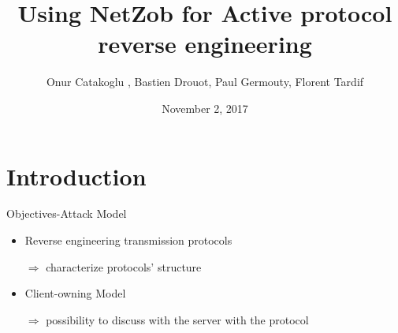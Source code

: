 \documentclass{beamer}
\newcounter{m} %
\newcounter{c} %
\begin{document}




\title{Using NetZob for Active protocol reverse engineering }   
\author{Onur Catakoglu , Bastien Drouot, Paul Germouty, Florent Tardif} 
\date{November 2, 2017} 




\begin{frame}

	\titlepage
\end{frame}





\begin{frame}


	\tableofcontents

\end{frame}

\section{Introduction}
\begin{frame}

	\tableofcontents[currentsection]
\end{frame}

\begin{frame}{Objectives-Attack Model}
\begin{itemize}
\item Reverse engineering transmission protocols

$\Rightarrow$ characterize protocols' structure

\item Client-owning Model

$\Rightarrow$ possibility to discuss with the server with the protocol
\end{itemize}
\end{frame}
\end{document}
